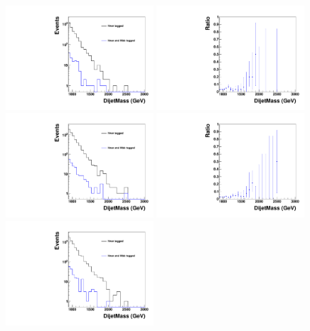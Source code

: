 \begin{figure}[htb]
\begin{center}
\includegraphics[width=0.49\textwidth]{HqqqqZqqfigs/HbbHww/HighPurity.pdf}
\includegraphics[width=0.49\textwidth]{HqqqqZqqfigs/HbbHww/HighPurityRatio.pdf}
\includegraphics[width=0.49\textwidth]{HqqqqZqqfigs/HbbHww/LowHPurity.pdf}
\includegraphics[width=0.49\textwidth]{HqqqqZqqfigs/HbbHww/LowHPurityRatio.pdf}
\includegraphics[width=0.49\textwidth]{HqqqqZqqfigs/HbbHww/LowVPurity.pdf}

\end{center}
\end{figure}
